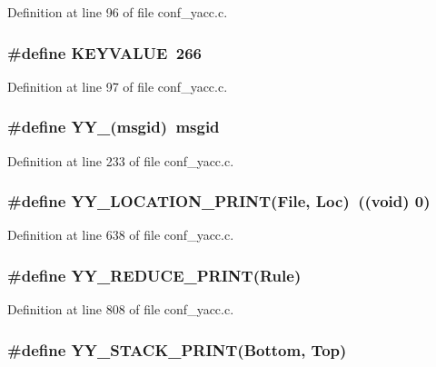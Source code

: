 Definition at line 96 of file conf\_\-yacc.c.
\subsubsection[{KEYVALUE}]{\setlength{\rightskip}{0pt plus 5cm}\#define KEYVALUE~266}\label{conf__yacc_8c_15956324a82088a2f23c936061145a97}




Definition at line 97 of file conf\_\-yacc.c.
\subsubsection[{YY\_\-}]{\setlength{\rightskip}{0pt plus 5cm}\#define YY\_\-(msgid)~msgid}\label{conf__yacc_8c_86f079016f11f0600f4259f3f03f8d43}




Definition at line 233 of file conf\_\-yacc.c.
\subsubsection[{YY\_\-LOCATION\_\-PRINT}]{\setlength{\rightskip}{0pt plus 5cm}\#define YY\_\-LOCATION\_\-PRINT(File, \/  Loc)~((void) 0)}\label{conf__yacc_8c_52c7d936ca7e6c34687ff71f29b8cfd1}




Definition at line 638 of file conf\_\-yacc.c.
\subsubsection[{YY\_\-REDUCE\_\-PRINT}]{\setlength{\rightskip}{0pt plus 5cm}\#define YY\_\-REDUCE\_\-PRINT(Rule)}\label{conf__yacc_8c_49ad456240785266cadae498ddae9310}




Definition at line 808 of file conf\_\-yacc.c.
\subsubsection[{YY\_\-STACK\_\-PRINT}]{\setlength{\rightskip}{0pt plus 5cm}\#define YY\_\-STACK\_\-PRINT(Bottom, \/  Top)}\label{conf__yacc_8c_7a52157fbe194e3a347afc4ef750af77}




